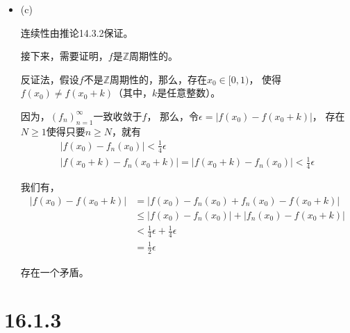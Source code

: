 \documentclass{article}
\begin{document}
\begin{itemize}
  \item (c)

        连续性由推论14.3.2保证。

        接下来，需要证明，$f$是$\mathbb{Z}$周期性的。

        反证法，假设$f$不是$\mathbb{Z}$周期性的，那么，存在$x_0 \in [0, 1)$，
        使得$f(x_0) \neq f(x_0 + k)$（其中，$k$是任意整数）。

        因为，$(f_n)_{n = 1}^\infty$一致收敛于$f$，
        那么，令$\epsilon = |f(x_0) - f(x_0 + k)|$，
        存在$N \geq 1$使得只要$n \geq N$，就有
        \begin{align*}
          |f(x_0) - f_n(x_0)| < \frac{1}{4} \epsilon \\
          |f(x_0 + k) - f_n(x_0 + k)| = |f(x_0 + k) - f_n(x_0)| < \frac{1}{4} \epsilon
        \end{align*}

        我们有，
        \begin{align*}
          |f(x_0) - f(x_0 + k)| & = |f(x_0) - f_n(x_0) + f_n(x_0) - f(x_0 + k)|      \\
                                & \leq |f(x_0) - f_n(x_0)| + |f_n(x_0) - f(x_0 + k)| \\
                                & < \frac{1}{4} \epsilon + \frac{1}{4} \epsilon      \\
                                & =  \frac{1}{2}\epsilon
        \end{align*}

        存在一个矛盾。
\end{itemize}

\section*{16.1.3}
\end{document}
